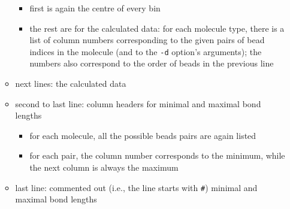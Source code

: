 \begin{enumerate}[nosep,leftmargin=20pt]
\begin{itemize}[nosep,leftmargin=5pt]
        \begin{itemize}[nosep,leftmargin=10pt]
          \item first is again the centre of every bin
          \item the rest are for the calculated data: for each molecule type,
            there is a list of column numbers corresponding to the given
            pairs of bead indices in the molecule (and to the \texttt{-d}
            option's arguments); the numbers also correspond to the order of
            beads in the previous line
        \end{itemize}
      \item next lines: the calculated data
      \item second to last line: column headers for minimal and maximal bond
        lengths
        \begin{itemize}[nosep,leftmargin=10pt]
          \item for each molecule, all the possible beads pairs are again listed
          \item for each pair, the column number corresponds to the minimum,
            while the next column is always the maximum
        \end{itemize}
      \item last line: commented out (i.e., the line starts with \texttt{\#})
        minimal and maximal bond lengths
    \end{itemize}
\end{enumerate}
